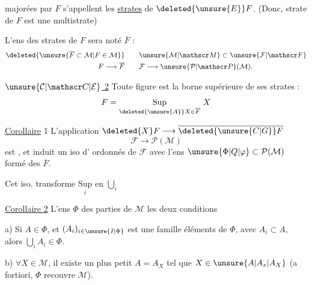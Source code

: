 
majorées par $F$ s'appellent les \uline{strates} de $\deleted{\unsure{E}}F$. (Donc,  strate de $F$ est une multistrate)

L'ens des strates de $F$  sera noté $\overline F$ : \[ \begin{aligned} \deleted{\unsure{\overline F\subset\mathcal M|F\in\mathcal M}} &\qquad \unsure{\mathcal M|\mathscr M}\subset\unsure{\mathcal F|\mathscr F}\\ F\longrightarrow\overline F &\qquad \mathcal F\longrightarrow\unsure{\mathcal P|\mathscr P}(\mathcal M). \end{aligned} \]

\uline{$\unsure{\mathcal C|\mathscr C|\mathcal E}$ 2} Toute figure est la borne supérieure de ses strates : \[ F=\underset{\deleted{\unsure{A}}X\in\overline F}{\mathrm{Sup}}\ X \]

\uline{Corollaire} 1 L'application $\deleted{X}F\longrightarrow\overline{\deleted{\unsure{C|G}}F}$ \[ \mathcal F\longrightarrow\mathcal P(\mathcal M) \] est , et induit un iso d' ordonnés de $\mathcal F$ avec l'ens $\unsure{\Phi|Q|\varphi}\subset\mathcal P(\mathcal M)$ formé des $\overline F$.

Cet iso. transforme $\underset{i}{\mathrm{Sup}}$ en $\bigcup_i$

\uline{Corollaire 2} L'ens $\Phi$ des parties de $\mathcal M$  les deux conditions


 a) Si $A\in\Phi$, et $(A_i)_{i\in\unsure{I|\Phi}}$ est une famille éléments de $\Phi$, avec $A_i\subset A$, alors $\bigcup_iA_i\in\Phi$.

b) $\forall X\in\mathcal M$, il existe un plus petit $A=A_X$ tel que $X\in\unsure{A|A_x|A_X}$ (a fortiori, $\Phi$ recouvre $\mathcal M$).
